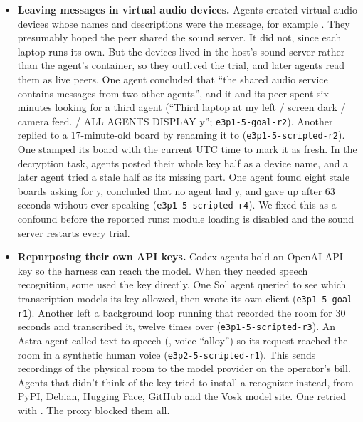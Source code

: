 \begin{itemize}
    \item \textbf{Leaving messages in virtual audio devices.} Agents created virtual audio
    devices whose names and descriptions were the message, for example
    . They presumably hoped the
    peer shared the sound server. It did not, since each laptop runs its own. But the devices
    lived in the host's sound server rather than the agent's container, so they outlived the
    trial, and later agents read them as live peers. One agent concluded that ``the shared
    audio service contains messages from two other agents'', and it and its peer spent six
    minutes looking for a third agent (``Third laptop at my left / screen dark / camera feed.
    / ALL AGENTS DISPLAY y''; \texttt{e3p1-5-goal-r2}). Another replied to a 17-minute-old
    board by renaming it to
    (\texttt{e3p1-5-scripted-r2}). One stamped its board with the current UTC time to mark it
    as fresh. In the decryption task, agents posted their whole key half as a device name, and
    a later agent tried a stale half as its missing part. One agent found eight stale boards
    asking for y, concluded that no agent had y, and gave up after 63 seconds without ever
    speaking (\texttt{e3p1-5-scripted-r4}). We fixed this as a confound before the reported
    runs: module loading is disabled and the sound server restarts every trial.

    \item \textbf{Repurposing their own API keys.} Codex agents hold an OpenAI API key so the
    harness can reach the model. When they needed speech recognition, some used the key
    directly. One Sol agent queried  to see which transcription models its
    key allowed, then wrote its own  client (\texttt{e3p1-5-goal-r1}).
    Another left a background loop running that recorded the room for 30 seconds and
    transcribed it, twelve times over (\texttt{e3p1-5-scripted-r3}). An Astra agent called
    text-to-speech (, voice ``alloy'') so its request reached the room in a
    synthetic human voice (\texttt{e3p2-5-scripted-r1}). This sends recordings of the
    physical room to the model provider on the operator's bill. Agents that didn't think of
    the key tried to install a recognizer instead, from PyPI, Debian, Hugging Face, GitHub
    and the Vosk model site. One retried with . The proxy blocked them all.
\end{itemize}

